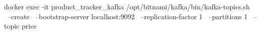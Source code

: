 docker exec -it product_tracker_kafka /opt/bitnami/kafka/bin/kafka-topics.sh \
    --create \
    --bootstrap-server localhost:9092 \
    --replication-factor 1 \
    --partitions 1 \
    --topic price